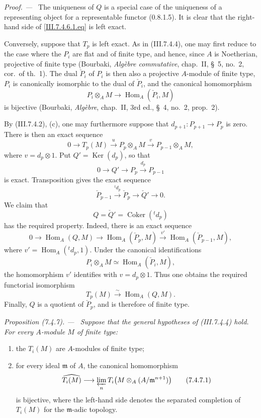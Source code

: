 \documentclass[10pt,oneside]{book}
\newcommand{\Hom}{\operatorname{Hom}}
\newcommand{\Ker}{\operatorname{Ker}}
\newcommand{\Coker}{\operatorname{Coker}}
\newcommand{\isoto}{\xrightarrow{\sim}}
\newcommand{\sref}[2][]{(#2)}
\newcommand{\oldpage}[2][]{\setcounter{footnote}{0}\marginpar{\scriptsize\textbf{#1}~|~#2}\ignorespaces}
\newenvironment{proposition}[1][]{\par\medskip\noindent\itshape Proposition (#1). ---\ }{\par}
\newenvironment{proof}{\par\medskip\noindent\textit{Proof. ---\ }}{\par}
\begin{document}
\begin{proof}
The uniqueness of $Q$ is a special case of the uniqueness of a
representing object for a representable functor
\sref[0]{0.8.1.5}.  It is clear that the right-hand side of
\eqref{III.7.4.6.1.eq} is left exact.

Conversely, suppose that $T_p$ is left exact.  As in
\sref{III.7.4.4}, one may first reduce to the case where the
$P_i$ are flat and of finite type, and hence, since $A$ is
Noetherian, projective of finite type (Bourbaki,
\emph{Alg\`ebre commutative}, chap.~II, \S~5, no.~2, cor.\ of
th.~1).  The dual $\check{P}_i$ of $P_i$ is then also a
projective $A$-module of finite type, $P_i$ is canonically
isomorphic to the dual of $\check{P}_i$, and the canonical
homomorphism
\[
  P_i\otimes_A M
  \longrightarrow
  \Hom_A(\check{P}_i,M)
\]
is bijective (Bourbaki, \emph{Alg\`ebre}, chap.~II,
3rd ed., \S~4, no.~2, prop.~2).

By \sref{III.7.4.2}, (c), one may furthermore suppose that
$d_{p+1}:P_{p+1}\to P_p$ is zero.  There is then an exact
sequence
\[
  0
  \longrightarrow T_p(M)
  \xrightarrow{u}
  P_p\otimes_A M
  \xrightarrow{v}
  P_{p-1}\otimes_A M,
\]
where $v=d_p\otimes 1$.  Put $Q'=\Ker(d_p)$, so that
\[
  0
  \longrightarrow Q'
  \longrightarrow P_p
  \xrightarrow{d_p}
  P_{p-1}
\]
is exact.  Transposition gives the exact sequence
\[
  \check{P}_{p-1}
  \xrightarrow{{}^t d_p}
  \check{P}_p
  \longrightarrow
  \check{Q}'
  \longrightarrow 0.
\]
We claim that
\[
  Q=\check{Q}'=\Coker({}^t d_p)
\]
has the required property.  Indeed, there is an exact sequence
\[
  0
  \longrightarrow \Hom_A(Q,M)
  \longrightarrow \Hom_A(\check{P}_p,M)
  \xrightarrow{v'}
  \Hom_A(\check{P}_{p-1},M),
\]
\oldpage[III]{189}
where $v'=\Hom_A({}^t d_p,1)$.  Under the canonical
identifications
\[
  P_i\otimes_A M\simeq\Hom_A(\check{P}_i,M),
\]
the homomorphism $v'$ identifies with $v=d_p\otimes 1$.
Thus one obtains the required functorial isomorphism
\[
  T_p(M)\isoto\Hom_A(Q,M).
\]
Finally, $Q$ is a quotient of $\check{P}_p$, and is therefore
of finite type.
\end{proof}

\begin{proposition}[7.4.7]
\label{III.7.4.7}
Suppose that the general hypotheses of \sref{III.7.4.4} hold.
For every $A$-module $M$ of finite type:
\begin{enumerate}
  \item[(i)] the $T_i(M)$ are $A$-modules of finite type;
  \item[(ii)] for every ideal $\mathfrak m$ of $A$, the
    canonical homomorphism
    \[
      \widehat{T_i(M)}
      \longrightarrow
      \varprojlim_n
      T_i\bigl(M\otimes_A(A/\mathfrak m^{n+1})\bigr)
      \tag{7.4.7.1}\label{III.7.4.7.1.eq}
    \]
    is bijective, where the left-hand side denotes the
    separated completion of $T_i(M)$ for the
    $\mathfrak m$-adic topology.
\end{enumerate}
\end{proposition}
\end{document}
